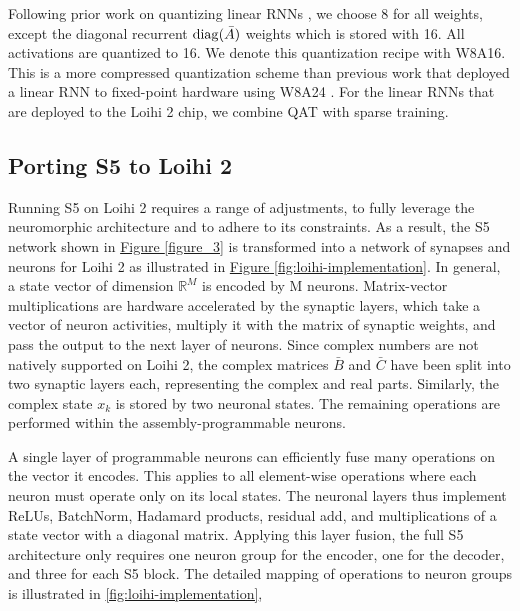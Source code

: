 Following prior work on quantizing linear RNNs \cite{abreu2024q}, we choose \qty{8}{\bit} for all weights, except the diagonal recurrent $\operatorname{diag} (\bar A)$ weights which is stored with \qty{16}{\bit}. All activations are quantized to \qty{16}{\bit}. We denote this quantization recipe with W8A16. This is a more compressed quantization scheme than previous work that deployed a linear RNN to fixed-point hardware using W8A24 \cite{meyer2024diagonal}.
% 
For the linear RNNs that are deployed to the Loihi 2 chip, we combine QAT with sparse training. 


\subsection{Porting S5 to Loihi 2}

Running S5 on Loihi 2 requires a range of adjustments, to fully leverage the neuromorphic architecture and to adhere to its constraints. As a result, the S5 network shown in \hyperref[figure_3]{Figure \ref{figure_3}} is transformed into a network of synapses and neurons for Loihi 2 as illustrated in \hyperref[fig:loihi-implementation]{Figure \ref{fig:loihi-implementation}}.
In general, a state vector of dimension $\mathbb{R}^{M}$ is encoded by M neurons. Matrix-vector multiplications are hardware accelerated by the synaptic layers, which take a vector of neuron activities, multiply it with the matrix of synaptic weights, and pass the output to the next layer of neurons.
Since complex numbers are not natively supported on Loihi 2, the complex matrices $\bar{B}$ and $\bar{C}$ have been split into two synaptic layers each, representing the complex and real parts. Similarly, the complex state $x_k$ is stored by two neuronal states.
The remaining operations are performed within the assembly-programmable neurons.

A single layer of programmable neurons can efficiently fuse many operations on the vector it encodes. This applies to all element-wise operations where each neuron must operate only on its local states.
The neuronal layers thus implement ReLUs, BatchNorm, Hadamard products, residual add, and multiplications of a state vector with a diagonal matrix.
Applying this layer fusion, the full S5 architecture only requires one neuron group for the encoder, one for the decoder, and three for each S5 block. 
The detailed mapping of operations to neuron groups is illustrated in \autoref{fig:loihi-implementation},